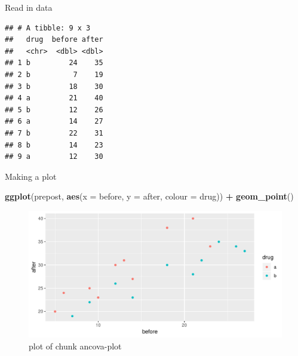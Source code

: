 \documentclass[ignorenonframetext,]{beamer}
\newenvironment{Shaded}{\begin{snugshade}}{\end{snugshade}}
\newcommand{\CommentTok}[1]{\textcolor[rgb]{0.56,0.35,0.01}{\textit{#1}}}
\newcommand{\DataTypeTok}[1]{\textcolor[rgb]{0.13,0.29,0.53}{#1}}
\newcommand{\DecValTok}[1]{\textcolor[rgb]{0.00,0.00,0.81}{#1}}
\newcommand{\KeywordTok}[1]{\textcolor[rgb]{0.13,0.29,0.53}{\textbf{#1}}}
\newcommand{\NormalTok}[1]{#1}
\newcommand{\OperatorTok}[1]{\textcolor[rgb]{0.81,0.36,0.00}{\textbf{#1}}}
\newcommand{\StringTok}[1]{\textcolor[rgb]{0.31,0.60,0.02}{#1}}
\begin{document}
\begin{frame}[fragile]{Read in data}
\protect\hypertarget{read-in-data-2}{}

\begin{Shaded}
\end{Shaded}

\begin{verbatim}
## # A tibble: 9 x 3
##   drug  before after
##   <chr>  <dbl> <dbl>
## 1 b         24    35
## 2 b          7    19
## 3 b         18    30
## 4 a         21    40
## 5 b         12    26
## 6 a         14    27
## 7 b         22    31
## 8 b         14    23
## 9 a         12    30
\end{verbatim}

\end{frame}

\begin{frame}[fragile]{Making a plot}
\protect\hypertarget{making-a-plot-1}{}

\begin{Shaded}
\begin{Highlighting}[]
\KeywordTok{ggplot}\NormalTok{(prepost, }\KeywordTok{aes}\NormalTok{(}\DataTypeTok{x =}\NormalTok{ before, }\DataTypeTok{y =}\NormalTok{ after, }\DataTypeTok{colour =}\NormalTok{ drug)) }\OperatorTok{+}
\StringTok{  }\KeywordTok{geom_point}\NormalTok{()}
\end{Highlighting}
\end{Shaded}

\begin{figure}
\centering
\includegraphics{figure/ancova-plot-1.pdf}
\caption{plot of chunk ancova-plot}
\end{figure}

\end{frame}
\end{document}
